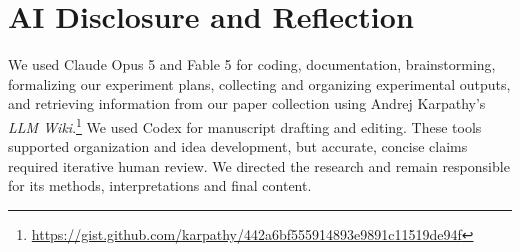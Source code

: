 \section*{AI Disclosure and Reflection}

We used Claude Opus 5 and Fable 5 for coding, documentation, brainstorming,
formalizing our experiment plans, collecting and organizing experimental outputs,
and retrieving information from our paper collection using
Andrej Karpathy's \emph{LLM Wiki}.\footnote{\url{https://gist.github.com/karpathy/442a6bf555914893e9891c11519de94f}}
We used Codex for manuscript drafting and editing. These tools supported
organization and idea development, but accurate, concise claims required
iterative human review. We directed the research and remain responsible for
its methods, interpretations and final content.
